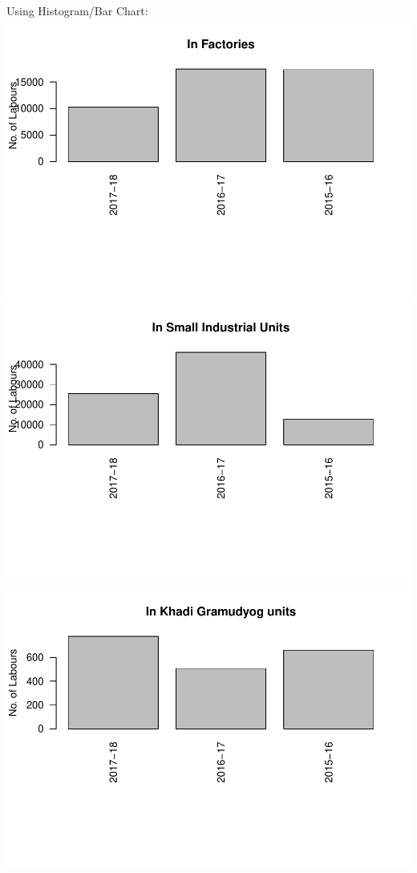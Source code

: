 \documentclass[]{article}
\begin{document}
Using Histogram/Bar Chart:
\includegraphics{Report_files/figure-latex/unnamed-chunk-7-1.pdf}
\includegraphics{Report_files/figure-latex/unnamed-chunk-7-2.pdf}
\includegraphics{Report_files/figure-latex/unnamed-chunk-7-3.pdf}
\end{document}
